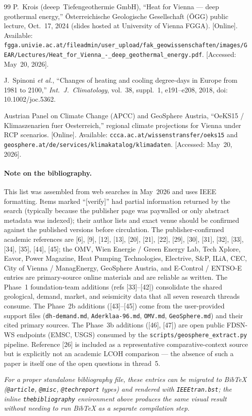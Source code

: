 \documentclass{article}
\begin{document}
\begin{thebibliography}{99}
P.~Krois (deeep~Tiefengeothermie GmbH), ``Heat for Vienna --- deep
geothermal energy,'' \"Osterreichische Geologische Gesellschaft (\"OGG)
public lecture, Oct.~17, 2024 (slides hosted at University of Vienna FGGA).
[Online]. Available:
\texttt{fgga.univie.ac.at/fileadmin/user\_upload/fak\_geowissenschaften/images/GEAR/Lectures/Heat\_for\_Vienna\_-\_deep\_geothermal\_energy.pdf}.
[Accessed: May~20, 2026].

J.~Spinoni \emph{et al.}, ``Changes of heating and cooling
degree-days in Europe from 1981 to 2100,'' \emph{Int.\ J.\ Climatology},
vol.~38, suppl.~1, e191--e208, 2018, doi: 10.1002/joc.5362.

Austrian Panel on Climate Change (APCC) and GeoSphere Austria,
``OeKS15 / Klimaszenarien fuer Oesterreich,'' regional climate
projections for Vienna under RCP scenarios. [Online]. Available:
\texttt{ccca.ac.at/wissenstransfer/oeks15} and
\texttt{geosphere.at/de/services/klimakatalog/klimadaten}.
[Accessed: May~20, 2026].

\end{thebibliography}

\paragraph{Note on the bibliography.}
This list was assembled from web searches in May~2026 and uses IEEE
formatting. Items marked ``[verify]'' had partial information returned by
the search (typically because the publisher page was paywalled or only
abstract metadata was indexed); their author lists and exact venue should
be confirmed against the published versions before circulation. The
publisher-confirmed academic references are [6], [9], [12], [13], [20],
[21], [22], [29], [30], [31], [32], [33], [34], [35], [44], [45]; the OMV, Wien
Energie / Green Energy Lab, Tech Xplore, Eavor, Power Magazine, Heat
Pumping Technologies, Electrive, S\&P, ILiA, CEC, City of Vienna /
ManagEnergy, GeoSphere Austria, and E-Control / ENTSO-E entries are
primary-source online materials and are reliable as written. The
Phase~1 foundation-team additions (refs [33]--[42]) consolidate the
shared geological, demand, market, and seismicity data that all seven
research threads consume. The Phase~2b additions ([43]--[45]) come from
the user-provided support files (\texttt{dh-demand.md},
\texttt{Aderklaa-96.md}, \texttt{OMV.md}, \texttt{GeoSphere.md}) and
their cited primary sources. The Phase~3b additions ([46], [47]) are
open public FDSN-WS endpoints (EMSC, USGS) consumed by the
\texttt{scripts/geosphere\_extract.py} pipeline. Reference [26] is included as a
representative comparative-context source but is explicitly not an
academic LCOH comparison --- the absence of such a paper is itself one
of the open questions in thread~5.

\medskip
\noindent\emph{For a proper standalone bibliography file, these entries
can be migrated to BibTeX (\texttt{@article}, \texttt{@misc},
\texttt{@techreport} types) and rendered with \texttt{IEEEtran.bst}; the
inline \texttt{thebibliography} environment above produces the same visual
result without needing to run BibTeX as a separate compilation step.}
\end{document}
